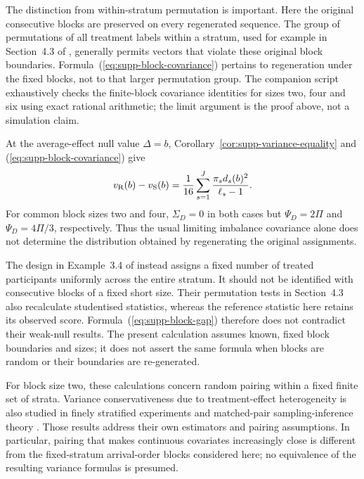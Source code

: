 \documentclass[12pt,a4paper]{article}
\theoremstyle{definition}
\theoremstyle{remark}\newtheorem{remark}{Remark}
\numberwithin{equation}{section}
\begin{document}
The distinction from within-stratum permutation is important. Here the original consecutive blocks are preserved on every regenerated sequence. The group of permutations of all treatment labels within a stratum, used for example in Section~4.3 of \citet{BugniCanayShaikh2018}, generally permits vectors that violate these original block boundaries. Formula~(\ref{eq:supp-block-covariance}) pertains to regeneration under the fixed blocks, not to that larger permutation group. The companion script exhaustively checks the finite-block covariance identities for sizes two, four and six using exact rational arithmetic; the limit argument is the proof above, not a simulation claim.

At the average-effect null value $\Delta=b$, Corollary~\ref{cor:supp-variance-equality} and (\ref{eq:supp-block-covariance}) give
\begin{equation}\label{eq:supp-block-gap}
 v_{\rm R}(b)-v_{\rm S}(b)
   =\frac1{16}\sum_{s=1}^J\frac{\pi_s d_s(b)^2}{\ell_s-1}.
\end{equation}
For common block sizes two and four, $\Sigma_D=0$ in both cases but $\Psi_D=2\Pi$ and $\Psi_D=4\Pi/3$, respectively. Thus the usual limiting imbalance covariance alone does not determine the distribution obtained by regenerating the original assignments.

The design in Example~3.4 of \citet{BugniCanayShaikh2018} instead assigns a fixed number of treated participants uniformly across the entire stratum. It should not be identified with consecutive blocks of a fixed short size. Their permutation tests in Section~4.3 also recalculate studentised statistics, whereas the reference statistic here retains its observed score. Formula~(\ref{eq:supp-block-gap}) therefore does not contradict their weak-null results. The present calculation assumes known, fixed block boundaries and sizes; it does not assert the same formula when blocks are random or their boundaries are re-generated.


For block size two, these calculations concern random pairing within a fixed finite set of strata. Variance conservativeness due to treatment-effect heterogeneity is also studied in finely stratified experiments \citep{Fogarty2018} and matched-pair sampling-inference theory \citep{BaiRomanoShaikh2022}. Those results address their own estimators and pairing assumptions. In particular, pairing that makes continuous covariates increasingly close is different from the fixed-stratum arrival-order blocks considered here; no equivalence of the resulting variance formulas is presumed.
\end{document}
